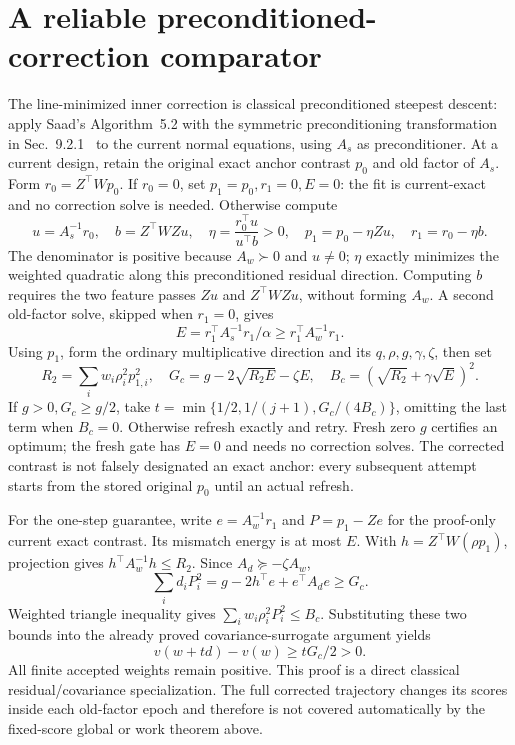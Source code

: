 \documentclass[11pt]{article}
\begin{document}
\section{A reliable preconditioned-correction comparator}
The line-minimized inner correction is classical preconditioned steepest descent: apply Saad's Algorithm~5.2 with the symmetric preconditioning transformation in Sec.~9.2.1~\cite{saad2003} to the current normal equations, using $A_s$ as preconditioner.
At a current design, retain the original exact anchor contrast $p_0$ and old factor of $A_s$. Form $r_0=Z^\top Wp_0$. If $r_0=0$, set $p_1=p_0,r_1=0,E=0$: the fit is current-exact and no correction solve is needed. Otherwise compute
\[
 u=A_s^{-1}r_0,\quad b=Z^\top WZu,\quad
 \eta=\frac{r_0^\top u}{u^\top b}>0,\quad
 p_1=p_0-\eta Zu,\quad r_1=r_0-\eta b.
\]
The denominator is positive because $A_w\succ0$ and $u\ne0$; $\eta$ exactly minimizes the weighted quadratic along this preconditioned residual direction. Computing $b$ requires the two feature passes $Zu$ and $Z^\top WZu$, without forming $A_w$. A second old-factor solve, skipped when $r_1=0$, gives
\[
 E=r_1^\top A_s^{-1}r_1/\alpha\ge
 r_1^\top A_w^{-1}r_1.
\]
Using $p_1$, form the ordinary multiplicative direction and its $q,\rho,g,\gamma,\zeta$, then set
\[
 R_2=\sum_iw_i\rho_i^2p_{1,i}^2,\quad
 G_c=g-2\sqrt{R_2E}-\zeta E,\quad
 B_c=(\sqrt{R_2}+\gamma\sqrt E)^2.
\]
If $g>0,G_c\ge g/2$, take $t=\min\{1/2,1/(j+1),G_c/(4B_c)\}$, omitting the last term when $B_c=0$. Otherwise refresh exactly and retry. Fresh zero $g$ certifies an optimum; the fresh gate has $E=0$ and needs no correction solves. The corrected contrast is not falsely designated an exact anchor: every subsequent attempt starts from the stored original $p_0$ until an actual refresh.

For the one-step guarantee, write $e=A_w^{-1}r_1$ and $P=p_1-Ze$ for the proof-only current exact contrast. Its mismatch energy is at most $E$. With $h=Z^\top W(\rho p_1)$, projection gives $h^\top A_w^{-1}h\le R_2$. Since $A_d\succeq-\zeta A_w$,
\[
 \sum_i d_iP_i^2=g-2h^\top e+e^\top A_de\ge G_c.
\]
Weighted triangle inequality gives $\sum_iw_i\rho_i^2P_i^2\le B_c$. Substituting these two bounds into the already proved covariance-surrogate argument yields
\[
 v(w+td)-v(w)\ge tG_c/2>0.
\]
All finite accepted weights remain positive. This proof is a direct classical residual/covariance specialization. The full corrected trajectory changes its scores inside each old-factor epoch and therefore is not covered automatically by the fixed-score global or work theorem above.
\end{document}
